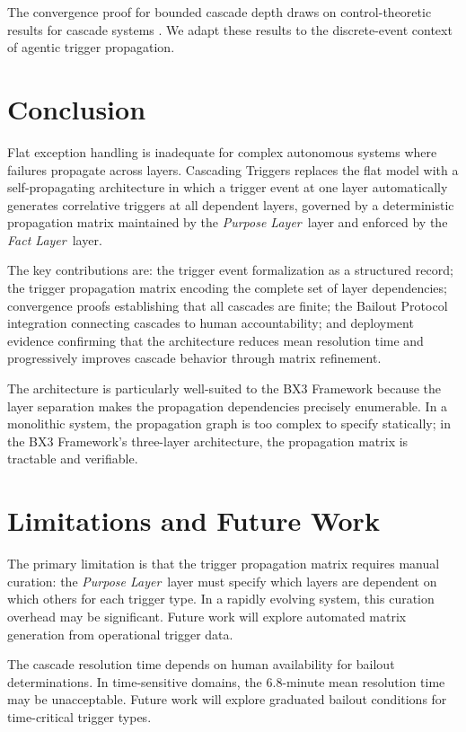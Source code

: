 \documentclass[12pt]{article}
\newcommand{\purpose}{\textit{Purpose Layer}}
\newcommand{\fact}{\textit{Fact Layer}}
\begin{document}
The convergence proof for bounded cascade depth draws on control-theoretic results for cascade systems \cite{tilbury2001}. We adapt these results to the discrete-event context of agentic trigger propagation.

\section{Conclusion}
\label{sec:conclusion}

Flat exception handling is inadequate for complex autonomous systems where failures propagate across layers. Cascading Triggers replaces the flat model with a self-propagating architecture in which a trigger event at one layer automatically generates correlative triggers at all dependent layers, governed by a deterministic propagation matrix maintained by the \purpose\ layer and enforced by the \fact\ layer.

The key contributions are: the trigger event formalization as a structured record; the trigger propagation matrix encoding the complete set of layer dependencies; convergence proofs establishing that all cascades are finite; the Bailout Protocol integration connecting cascades to human accountability; and deployment evidence confirming that the architecture reduces mean resolution time and progressively improves cascade behavior through matrix refinement.

The architecture is particularly well-suited to the BX3 Framework because the layer separation makes the propagation dependencies precisely enumerable. In a monolithic system, the propagation graph is too complex to specify statically; in the BX3 Framework's three-layer architecture, the propagation matrix is tractable and verifiable.

\section{Limitations and Future Work}
\label{sec:limitations}

The primary limitation is that the trigger propagation matrix requires manual curation: the \purpose\ layer must specify which layers are dependent on which others for each trigger type. In a rapidly evolving system, this curation overhead may be significant. Future work will explore automated matrix generation from operational trigger data.

The cascade resolution time depends on human availability for bailout determinations. In time-sensitive domains, the 6.8-minute mean resolution time may be unacceptable. Future work will explore graduated bailout conditions for time-critical trigger types.
\end{document}
